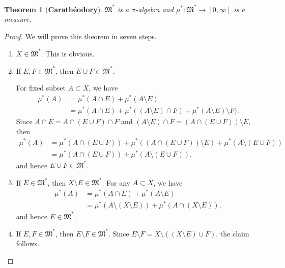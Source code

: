 \documentclass[11pt]{book}
\newtheorem{theorem}{Theorem}[chapter]
\theoremstyle{definition}
\numberwithin{equation}{chapter}
\def\MM{\mathfrak{M}}
\begin{document}
\begin{theorem}[{\bf Carathéodory}]\label{caratheodory_theorem}
$\MM^*$ is a $\sigma$-algebra and $\mu^*: \MM^* \to [0, \infty]$ is a measure.
\end{theorem}
\begin{proof}
We will prove this theorem in seven steps.
\begin{enumerate}[label=(\Roman*)]
    \item $X \in \MM^*$. This is obvious. \label{Caratheodory_step1}
    
    \item If $E, F \in \MM^*$, then $E \cup F \in \MM^*$.
    
    For fixed subset $A \subset X$, we have
    \begin{align*}
        \mu^*(A) & = \mu^*(A \cap E) + \mu^*(A \setminus E) \\
        & = \mu^*(A \cap E) + \mu^*((A \setminus E) \cap F) + \mu^*(A \setminus E) \setminus F).
    \end{align*}
    Since $A \cap E = A \cap (E \cup F) \cap F$ and $(A \setminus E)\cap F = (A \cap (E \cup F)) \setminus E$, then 
    \begin{align*}
        \mu^*(A) & = \mu^*(A \cap (E \cup F)) + \mu^*((A \cap (E \cup F)) \setminus E) + \mu^*(A \setminus (E \cup F)) \\
        & = \mu^*(A \cap (E \cup F)) + \mu^*(A \setminus (E \cup F)),
    \end{align*}
    and hence $E \cup F \in \MM^*$. \label{Caratheodory_step2}
    
    \item If $E \in \MM^*$, then $X \setminus E \in \MM^*$. For any $A \subset X$, we have
    \begin{align*}
        \mu^*(A) & = \mu^*(A \cap E) + \mu^*(A \setminus E) \\
        & = \mu^*(A \setminus (X \setminus E)) + \mu^*(A \cap (X \setminus E)),
    \end{align*}
    and hence $E \in \MM^*$. \label{Caratheodory_step3}
    
    \item If $E, F \in \MM^*$, then $E \setminus F \in \MM^*$. Since $E \setminus F = X \setminus ((X \setminus E) \cup F)$, the claim follows. \label{Caratheodory_step4}
    

\end{enumerate}
\end{proof}
\end{document}
